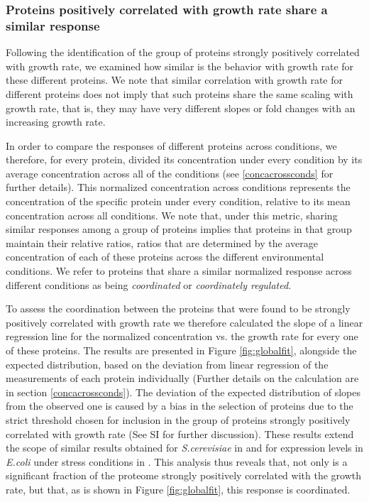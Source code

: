 \subsubsection{Proteins positively correlated with growth rate share a similar response}
\label{propchange} 

Following the identification of the group of proteins strongly positively correlated with growth rate, we examined how similar is the behavior with growth rate for these different proteins.
We note that similar correlation with growth rate for different proteins does not imply that such proteins share the same scaling with growth rate, that is,  they may have very different slopes or fold changes with an increasing growth rate.


In order to compare the responses of different proteins across conditions, we therefore, for every protein,  divided its concentration under every condition by its average concentration across all of the conditions (see \ref{concacrossconds} for further details).
This normalized concentration across conditions represents the concentration of the specific protein under every condition, relative to its mean concentration across all conditions.
We note that, under this metric, sharing similar responses among a group of proteins implies that proteins in that group maintain their relative ratios, ratios that are determined by the average concentration of each of these proteins across the different environmental conditions.
We refer to proteins that share a similar normalized response across different conditions as being \emph{coordinated} or \emph{coordinately regulated}.

To assess the coordination between the proteins that were found to be strongly positively correlated with growth rate we therefore calculated the slope of a linear regression line for the normalized concentration vs. the growth rate for every one of these proteins.
The results are presented in Figure \ref{fig:globalfit}, alongside the expected distribution, based on the deviation from linear regression of the measurements of each protein individually (Further details on the calculation are in section \ref{concacrossconds}).
The deviation of the expected distribution of slopes from the observed one is caused by a bias in the selection of proteins due to the strict threshold chosen for inclusion in the group of proteins strongly positively correlated with growth rate (See SI for further discussion).
These results extend the scope of similar results obtained for \emph{S.cerevisiae} in \cite{Keren2013a} and for expression levels in \emph{E.coli} under stress conditions in \cite{Kaneko2014}.
This analysis thus reveals that, not only is a significant fraction of the proteome strongly positively correlated with the growth rate, but that, as is shown in Figure \ref{fig:globalfit}, this response is coordinated.

